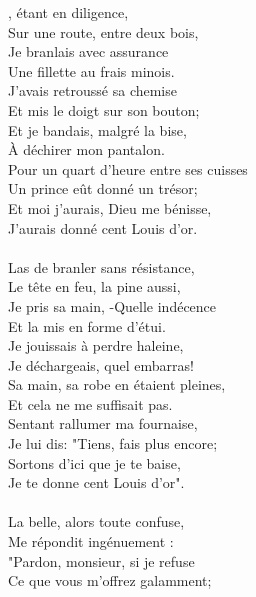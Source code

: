 \vspace{-0.3cm}
, étant en diligence,
\\Sur une route, entre deux bois,
\\Je branlais avec assurance
\\Une fillette au frais minois.
\\J'avais retroussé sa chemise
\\Et mis le doigt sur son bouton;
\\Et je bandais, malgré la bise,
\\À déchirer mon pantalon.
\\Pour un quart d'heure entre ses cuisses
\\Un prince eût donné un trésor;
\\Et moi j'aurais, Dieu me bénisse,
\\J'aurais donné cent Louis d'or.
\\\\Las de branler sans résistance,
\\Le tête en feu, la pine aussi,
\\Je pris sa main, -Quelle indécence
\\Et la mis en forme d'étui.
\\Je jouissais à perdre haleine,
\\Je déchargeais, quel embarras!
\\Sa main, sa robe en étaient pleines,
\\Et cela ne me suffisait pas.
\\Sentant rallumer ma fournaise,
\\Je lui dis: "Tiens, fais plus encore;
\\Sortons d'ici que je te baise,
\\Je te donne cent Louis d'or".
\\\\La belle, alors toute confuse,
\\Me répondit ingénuement :
\\"Pardon, monsieur, si je refuse
\\Ce que vous m'offrez galamment;
